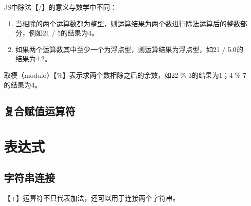 JS中除法【/】的意义与数学中不同：

\begin{enumerate}
	\item 当相除的两个运算数都为整型，则运算结果为两个数进行除法运算后的整数部分，例如21 / 5的结果为4。

	\item 如果两个运算数其中至少一个为浮点型，则运算结果为浮点型，如21 / 5.0的结果为4.2。
\end{enumerate}

取模（modulo）【\%】表示求两个数相除之后的余数，如22 \% 3的结果为1；4 \% 7的结果为4。

\subsection{复合赋值运算符}

\begin{table}[H]
	\centering
	\caption{复合赋值运算符}
\end{table}

\newpage

\section{表达式}

\subsection{字符串连接}

【+】运算符不只代表加法，还可以用于连接两个字符串。 \\

